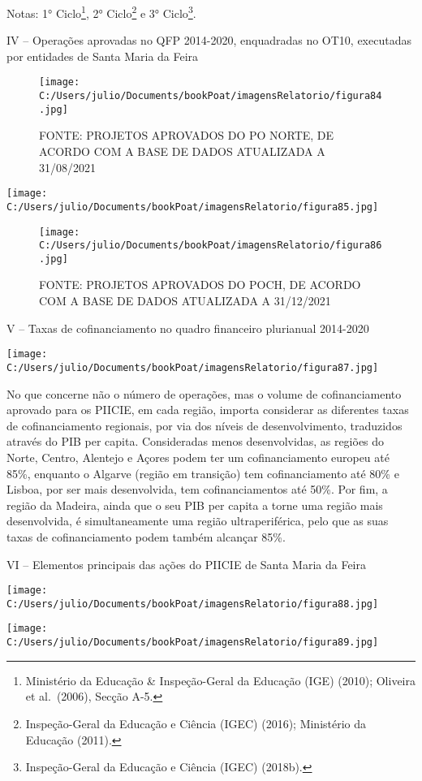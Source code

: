\documentclass[
]{book}
\begin{document}
Notas: 1° Ciclo\footnote{Ministério da Educação \& Inspeção-Geral da Educação (IGE) (2010); Oliveira et al.~(2006), Secção A-5.}, 2° Ciclo\footnote{Inspeção-Geral da Educação e Ciência (IGEC) (2016); Ministério da Educação (2011).} e 3° Ciclo\footnote{Inspeção-Geral da Educação e Ciência (IGEC) (2018b).}.

IV -- Operações aprovadas no QFP 2014-2020, enquadradas no OT10, executadas por entidades de Santa Maria da Feira

\begin{figure}
\centering
\texttt{[image: C:/Users/julio/Documents/bookPoat/imagensRelatorio/figura84.jpg]}
\caption{FONTE: PROJETOS APROVADOS DO PO NORTE, DE ACORDO COM A BASE DE DADOS ATUALIZADA A 31/08/2021}
\end{figure}

\texttt{[image: C:/Users/julio/Documents/bookPoat/imagensRelatorio/figura85.jpg]}

\begin{figure}
\centering
\texttt{[image: C:/Users/julio/Documents/bookPoat/imagensRelatorio/figura86.jpg]}
\caption{FONTE: PROJETOS APROVADOS DO POCH, DE ACORDO COM A BASE DE DADOS ATUALIZADA A 31/12/2021}
\end{figure}

V -- Taxas de cofinanciamento no quadro financeiro plurianual 2014-2020

\texttt{[image: C:/Users/julio/Documents/bookPoat/imagensRelatorio/figura87.jpg]}

No que concerne não o número de operações, mas o volume de cofinanciamento aprovado para os PIICIE, em cada região, importa considerar as diferentes taxas de cofinanciamento regionais, por via dos níveis de desenvolvimento, traduzidos através do PIB per capita. Consideradas menos desenvolvidas, as regiões do Norte, Centro, Alentejo e Açores podem ter um cofinanciamento europeu até 85\%, enquanto o Algarve (região em transição) tem cofinanciamento até 80\% e Lisboa, por ser mais desenvolvida, tem cofinanciamentos até 50\%. Por fim, a região da Madeira, ainda que o seu PIB per capita a torne uma região mais desenvolvida, é simultaneamente uma região ultraperiférica, pelo que as suas taxas de cofinanciamento podem também alcançar 85\%.

VI -- Elementos principais das ações do PIICIE de Santa Maria da Feira

\texttt{[image: C:/Users/julio/Documents/bookPoat/imagensRelatorio/figura88.jpg]}

\texttt{[image: C:/Users/julio/Documents/bookPoat/imagensRelatorio/figura89.jpg]}
\end{document}
